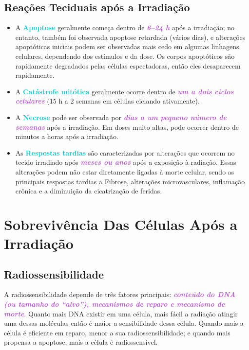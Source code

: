 \documentclass[11pt,a4paper]{article}
\begin{document}
\subsection*{Reações Teciduais após a Irradiação}

	\begin{itemize}[label=\textcolor{CarnationPink}{$\star$}]
		\item A \textcolor{DarkTurquoise}{\textbf{Apoptose}} geralmente começa dentro de \textcolor{MediumOrchid}{\textbf{\textit{6–24 h}}} após a irradiação; no entanto, também foi observada apoptose retardada (vários dias), e alterações apoptóticas iniciais podem ser observadas mais cedo em algumas linhagens celulares, dependendo dos estímulos e da dose. Os corpos apoptóticos são rapidamente degradados pelas células espectadoras, então eles desaparecem rapidamente.
		\item A \textcolor{DarkTurquoise}{\textbf{Catástrofe mitótica}} geralmente ocorre dentro de \textcolor{MediumOrchid}{\textbf{\textit{um a dois ciclos celulares}}} (15 h a 2 semanas em células ciclando ativamente).
		\item A \textcolor{DarkTurquoise}{\textbf{Necrose}} pode ser observada por \textcolor{MediumOrchid}{\textbf{\textit{dias a um pequeno número de semanas}}} após a irradiação. Em doses muito altas, pode ocorrer dentro de minutos a horas após a irradiação.
		\item As \textcolor{DarkTurquoise}{\textbf{Respostas tardias}} são caracterizadas por alterações que ocorrem no tecido irradiado após \textcolor{MediumOrchid}{\textbf{\textit{meses ou anos}}} após a exposição à radiação. Essas alterações podem não estar diretamente ligadas à morte celular, sendo as principais respostas tardias a Fibrose, alterações microvasculares, inflamação crônica e a diminuição da cicatrização de feridas.
	\end{itemize}

\section{Sobrevivência Das Células Após a Irradiação}

\subsection*{Radiossensibilidade}

	A radiossensibilidade depende de três fatores principais: \textcolor{MediumOrchid}{\textbf{\textit{conteúdo do DNA (ou tamanho do “alvo”), mecanismos de reparo e mecanismo de morte}}}. Quanto mais DNA existir em uma célula, mais fácil a radiação atingir uma dessas moléculas então é maior a sensibilidade dessa célula. Quando mais a célula é eficiente em reparo, menor a sua radiossensibilidade; e quando mais propensa a apoptose, mais a célula é radiossensível.
\end{document}
